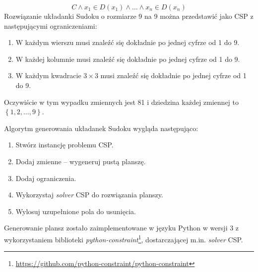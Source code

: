 \documentclass[]{project_report}
\begin{document}
	\begin{equation*}
		C \land x_{1} \in D(x_{1}) \land \ldots \land x_{n} \in D(x_{n})
	\end{equation*}
	Rozwiązanie układanki Sudoku o rozmiarze 9 na 9 można przedstawić jako CSP z następującymi ograniczeniami:
	\begin{enumerate}
		\item W każdym wierszu musi znaleźć się dokładnie po jednej cyfrze od 1 do 9.
		\item W każdej kolumnie musi znaleźć się dokładnie po jednej cyfrze od 1 do 9.
		\item W każdym kwadracie \(3 \times 3\) musi znaleźć się dokładnie po jednej cyfrze od 1 do 9.            
	\end{enumerate}
	Oczywiście w tym wypadku zmiennych jest 81 i dziedzina każdej zmiennej to \(\left\lbrace 1, 2, \ldots, 9 \right\rbrace\).
	
	Algorytm generowania układanek Sudoku wygląda następująco:
	\begin{enumerate}
		\item Stwórz instancję problemu CSP.
		\item Dodaj zmienne -- wygeneruj pustą planszę.
		\item Dodaj ograniczenia.
		\item Wykorzystaj \textit{solver} CSP do rozwiązania planszy.
		\item Wylosuj uzupełnione pola do usunięcia.
	\end{enumerate}
	
	Generowanie plansz zostało zaimplementowane w języku Python w wersji 3 z wykorzystaniem biblioteki \textit{python-constraint}\footnote{\url{https://github.com/python-constraint/python-constraint}}, dostarczającej m.in. \textit{solver} CSP.
	
\end{document}

